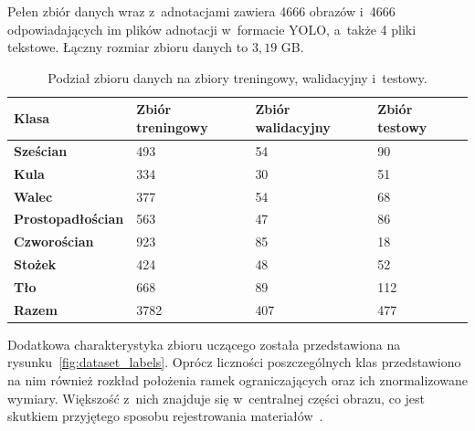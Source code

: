 Pełen zbiór danych wraz z~adnotacjami zawiera 4666 obrazów i~4666 odpowiadających im plików adnotacji w~formacie YOLO, a~także 4 pliki tekstowe. Łączny rozmiar zbioru danych to $3,19$ GB.

\begin{table}
    \centering
    \caption{Podział zbioru danych na zbiory treningowy, walidacyjny i~testowy.}
    \label{tab:dataset_split}
    \begin{tabularx}{\textwidth}{l|XXX}
        \toprule
        \textbf{Klasa}            & \textbf{Zbiór treningowy} & \textbf{Zbiór walidacyjny} & \textbf{Zbiór testowy} \\
        \midrule
        \textbf{Sześcian}         & 493                       & 54                         & 90                     \\
        \textbf{Kula}             & 334                       & 30                         & 51                     \\
        \textbf{Walec}            & 377                       & 54                         & 68                     \\
        \textbf{Prostopadłościan} & 563                       & 47                         & 86                     \\
        \textbf{Czworościan}      & 923                       & 85                         & 18                     \\
        \textbf{Stożek}           & 424                       & 48                         & 52                     \\
        \textbf{Tło}              & 668                       & 89                         & 112                    \\
        \midrule

        \textbf{Razem}            & 3782                      & 407                        & 477                    \\
        \bottomrule
    \end{tabularx}
\end{table}

Dodatkowa charakterystyka zbioru uczącego została przedstawiona na rysunku~\ref{fig:dataset_labels}. Oprócz liczności poszczególnych klas przedstawiono na nim również rozkład położenia ramek ograniczających oraz ich znormalizowane wymiary. Większość z~nich znajduje się w~centralnej części obrazu, co jest skutkiem przyjętego sposobu rejestrowania materiałów~.


